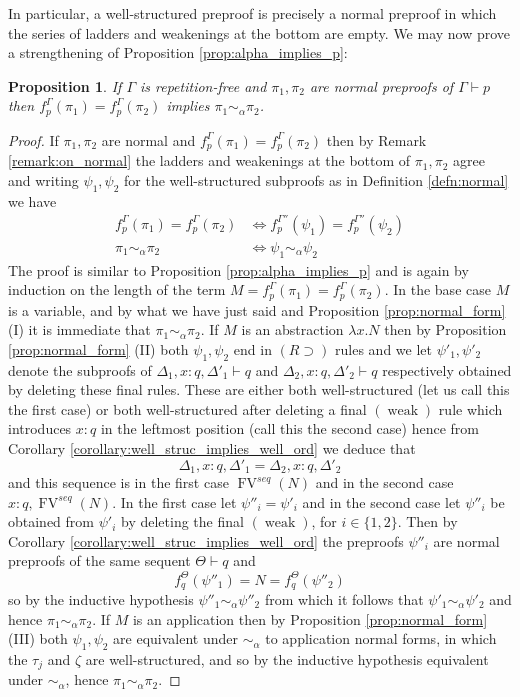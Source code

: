 \documentclass[english,letter paper,12pt,leqno]{article}
\newtheorem{proposition}[theorem]{Proposition}
\theoremstyle{example}
\numberwithin{equation}{section}
\def\imp{\supset}
\begin{document}
In particular, a well-structured preproof is precisely a normal preproof in which the series of ladders and weakenings at the bottom are empty. We may now prove a strengthening of Proposition \ref{prop:alpha_implies_p}:

\begin{proposition}\label{prop:alpha_iff_alpha} If $\Gamma$ is repetition-free and $\pi_1, \pi_2$ are normal preproofs of $\Gamma \vdash p$ then $f^\Gamma_p(\pi_1) = f^\Gamma_p(\pi_2)$ implies $\pi_1 \sim_\alpha \pi_2$.
\end{proposition}
\begin{proof}
If $\pi_1,\pi_2$ are normal and $f^\Gamma_p(\pi_1) = f^\Gamma_p(\pi_2)$ then by Remark \ref{remark:on_normal} the ladders and weakenings at the bottom of $\pi_1,\pi_2$ agree and writing $\psi_1, \psi_2$ for the well-structured subproofs as in Definition \ref{defn:normal} we have
\begin{align}
f^\Gamma_p(\pi_1) = f^\Gamma_p(\pi_2) &\Longleftrightarrow f^{\Gamma''}_p(\psi_1) = f^{\Gamma''}_p(\psi_2)\label{eq:alpha_iff_alpha1}\\
\pi_1 \sim_\alpha \pi_2 &\Longleftrightarrow \psi_1 \sim_\alpha \psi_2 \label{eq:alpha_iff_alpha2}
\end{align}
The proof is similar to Proposition \ref{prop:alpha_implies_p} and is again by induction on the length of the term $M = f^\Gamma_p(\pi_1) = f^\Gamma_p(\pi_2)$. In the base case $M$ is a variable, and by what we have just said and Proposition \ref{prop:normal_form} (I) it is immediate that $\pi_1 \sim_{\alpha} \pi_2$. If $M$ is an abstraction $\lambda x. N$ then by Proposition \ref{prop:normal_form} (II) both $\psi_1, \psi_2$ end in $(R \imp)$ rules and we let $\psi'_1, \psi'_2$ denote the subproofs of $\Delta_1, x:q, \Delta'_1 \vdash q$ and $\Delta_2, x:q, \Delta'_2 \vdash q$ respectively obtained by deleting these final rules. These are either both well-structured (let us call this the first case) or both well-structured after deleting a final $(\operatorname{weak})$ rule which introduces $x:q$ in the leftmost position (call this the second case) hence from Corollary \ref{corollary:well_struc_implies_well_ord} we deduce that
\[
\Delta_1, x:q, \Delta'_1 = \Delta_2, x:q, \Delta'_2
\]
and this sequence is in the first case $\operatorname{FV}^{seq}(N)$ and in the second case $x:q,\operatorname{FV}^{seq}(N)$. In the first case let $\psi''_i = \psi'_i$ and in the second case let $\psi''_i$ be obtained from $\psi'_i$ by deleting the final $(\operatorname{weak})$, for $i \in \{1, 2\}$. Then by Corollary \ref{corollary:well_struc_implies_well_ord} the preproofs $\psi''_i$ are normal preproofs of the same sequent $\Theta \vdash q$ and 
\[
f^{\Theta}_q(\psi''_1) = N = f^{\Theta}_q(\psi''_2)
\]
so by the inductive hypothesis $\psi''_1 \sim_\alpha \psi''_2$ from which it follows that $\psi'_1 \sim_\alpha \psi'_2$ and hence $\pi_1 \sim_\alpha \pi_2$. If $M$ is an application then by Proposition \ref{prop:normal_form} (III) both $\psi_1, \psi_2$ are equivalent under $\sim_\alpha$ to application normal forms, in which the $\tau_j$ and $\zeta$ are well-structured, and so by the inductive hypothesis equivalent under $\sim_\alpha$, hence $\pi_1 \sim_\alpha \pi_2$.
\end{proof}
\end{document}
